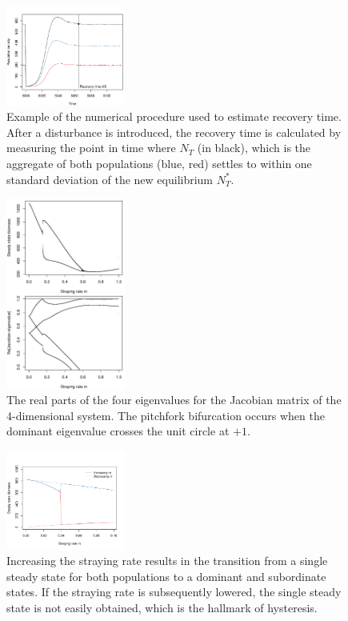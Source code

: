 \documentclass{revtex4}
\begin{document}
\begin{figure}
  \captionsetup{justification=raggedright,
singlelinecheck=false
}
\centering
\includegraphics[width=0.35\textwidth]{fig_recovery.pdf}
\caption{
Example of the numerical procedure used to estimate recovery time. After a disturbance is introduced, the recovery time is calculated by measuring the point in time where $N_T$ (in black), which is the aggregate of both populations (blue, red) settles to within one standard deviation of the new equilibrium $N_T^*$. 
} \label{fig:recovery}
\end{figure}


\begin{figure}
  \captionsetup{justification=raggedright,
singlelinecheck=false
}
\centering
\includegraphics[width=0.35\textwidth]{fig_eigs.pdf}
\caption{
The real parts of the four eigenvalues for the Jacobian matrix of the 4-dimensional system.
The pitchfork bifurcation occurs when the dominant eigenvalue crosses the unit circle at $+1$. 
} \label{fig:eigs}
\end{figure}

\begin{figure}
  \captionsetup{justification=raggedright,
singlelinecheck=false
}
\centering
\includegraphics[width=0.35\textwidth]{fig_hysteresis.pdf}
\caption{
Increasing the straying rate results in the transition from a single steady state for both populations to a dominant and subordinate states. If the straying rate is subsequently lowered, the single steady state is not easily obtained, which is the hallmark of hysteresis.
} \label{fig:hysteresis}
\end{figure}
\end{document}
